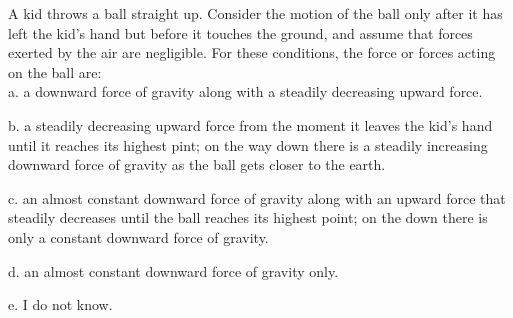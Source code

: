 
A kid throws a ball straight up. Consider the motion of the ball only after it has left the kid's hand but before it touches the ground, and assume that forces exerted by the air are negligible. For these conditions, the force or forces acting on the ball are: \\

a. a downward force of gravity along with a steadily decreasing upward force.

b. a steadily decreasing upward force from the moment it leaves the kid's hand until it reaches its highest pint; on the way down there is a steadily increasing downward force of gravity as the ball gets closer to the earth.

c. an almost constant downward force of gravity along with an upward force that steadily decreases until the ball reaches its highest point; on the down there is only a constant downward force of gravity.

d. an almost constant downward force of gravity only.

e. I do not know. \\
